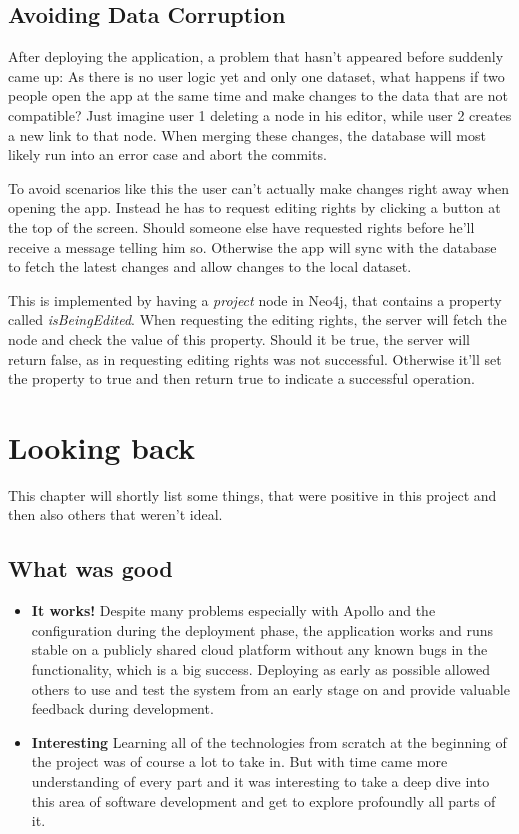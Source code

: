 \newpage
\section{Avoiding Data Corruption}
After deploying the application, a problem that hasn't appeared before suddenly came up: As there is no user logic yet and only one dataset, what happens if two people open the app at the same time and make changes to the data that are not compatible? Just imagine user 1 deleting a node in his editor, while user 2 creates a new link to that node. When merging these changes, the database will most likely run into an error case and abort the commits.

To avoid scenarios like this the user can't actually make changes right away when opening the app. Instead he has to request editing rights by clicking a button at the top of the screen. Should someone else have requested rights before he'll receive a message telling him so. Otherwise the app will sync with the database to fetch the latest changes and allow changes to the local dataset.

This is implemented by having a \emph{project} node in Neo4j, that contains a property called \emph{isBeingEdited}. When requesting the editing rights, the server will fetch the node and check the value of this property. Should it be true, the server will return false, as in requesting editing rights was not successful. Otherwise it'll set the property to true and then return true to indicate a successful operation.

\chapter{Looking back}
\label{chap:LB}
This chapter will shortly list some things, that were positive in this project and then also others that weren't ideal.

\section{What was good}
\begin{itemize}
\item \textbf{It works!} Despite many problems especially with Apollo and the configuration during the deployment phase, the application works and runs stable on a publicly shared cloud platform without any known bugs in the functionality, which is a big success. Deploying as early as possible allowed others to use and test the system from an early stage on and provide valuable feedback during development.

\item \textbf{Interesting} Learning all of the technologies from scratch at the beginning of the project was of course a lot to take in. But with time came more understanding of every part and it was interesting to take a deep dive into this area of software development and get to explore profoundly all parts of it.
\end{itemize}

